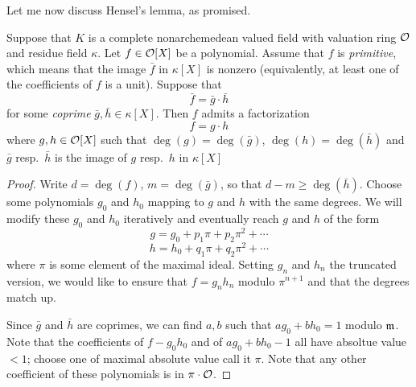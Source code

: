 Let me now discuss Hensel's lemma, as promised.
\begin{theorem}
  Suppose that $K$ is a complete nonarchemedean valued field with valuation ring $\mathcal{O}$ and residue field $\kappa$.
  Let $f \in \mathcal{O}[X]$ be a polynomial.
  Assume that $f$ is \emph{primitive}, which means that the image $\bar f$ in $\kappa[X]$ is nonzero (equivalently, at least one of the coefficients of $f$ is a unit).
  Suppose that
  \[ \bar f = \bar g \cdot \bar h \]
  for some \emph{coprime} $\bar g, \bar h \in \kappa[X]$.
  Then $f$ admits a factorization
  \[ f = g \cdot h \]
  where $g,h \in \mathcal{O}[X]$ such that $\deg(g) = \deg(\bar g)$, $\deg(h) = \deg(\bar h)$ and $\bar g$ resp.~$\bar h$ is the image of $g$ resp.~$h$ in $\kappa[X]$
\end{theorem}
\begin{proof}
  Write $d = \deg(f)$, $m = \deg(\bar g)$, so that $d - m \geq \deg(\bar h)$.
  Choose some polynomials $g_{0}$ and $h_{0}$ mapping to $g$ and $h$ with the same degrees.
  We will modify these $g_{0}$ and $h_{0}$ iteratively and eventually reach $g$ and $h$ of the form
  \[ g = g_{0} + p_{1} \pi + p_{2} \pi^{2} + \cdots \]
  \[ h = h_{0} + q_{1} \pi + q_{2} \pi^{2} + \cdots \]
  where $\pi$ is some element of the maximal ideal.
  Setting $g_{n}$ and $h_{n}$ the truncated version, we would like to ensure that $f = g_{n} h_{n}$ modulo $\pi^{n+1}$ and that the degrees match up.

  Since $\bar g$ and $\bar h$ are coprimes, we can find $a,b$ such that $ag_{0} + b h_{0} = 1$ modulo $\mathfrak{m}$.
  Note that the coefficients of $f - g_{0} h_{0}$ and of $ag_{0} + b h_{0} - 1$ all have absoltue value $< 1$; choose one of maximal absolute value call it $\pi$.
  Note that any other coefficient of these polynomials is  in $\pi \cdot \mathcal{O}$.


\end{proof}
